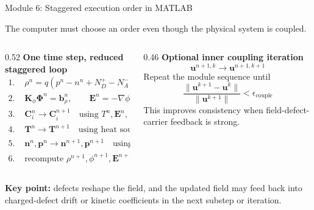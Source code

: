 \documentclass[aspectratio=169,9pt]{beamer}
\newcommand{\grad}{\nabla}
\newcommand{\E}{\bm{E}}
\newcommand{\vect}[1]{\bm{#1}}
\newcommand{\mat}[1]{\mathbf{#1}}
\begin{document}
\begin{frame}{Module 6: Staggered execution order in MATLAB}
\footnotesize
\vspace{-3mm}
\begin{bluebox}
\centering
The computer must choose an order even though the physical system is coupled.
\end{bluebox}

\vspace{1mm}
\begin{columns}[T,totalwidth=\textwidth]
\begin{column}{0.52\textwidth}
\textbf{One time step, reduced staggered loop}
\begin{align*}
\text{1. }&\rho^n=q(p^n-n^n+N_D^+-N_A^-)+q\sum_i z_iC_i^n,\\
\text{2. }&\mat{K}_{\phi}\vect{\Phi}^n=\vect{b}_{\rho}^n,
\qquad \E^n=-\grad\phi^n,\\
\text{3. }&\vect{C}_i^{n}\rightarrow\vect{C}_i^{n+1}\quad\text{using }T^n,\E^n,\\
\text{4. }&\vect{T}^{n}\rightarrow\vect{T}^{n+1}\quad\text{using heat sources},\\
\text{5. }&\vect{n}^{n},\vect{p}^{n}\rightarrow\vect{n}^{n+1},\vect{p}^{n+1}\quad\text{using }\E^n,C_i^{n+1},T^{n+1},\\
\text{6. }&\text{recompute }\rho^{n+1},\phi^{n+1},\E^{n+1}.
\end{align*}
\end{column}
\begin{column}{0.46\textwidth}
\textbf{Optional inner coupling iteration}
\begin{equation*}
\boxed{\vect{u}^{n+1,k}\rightarrow\vect{u}^{n+1,k+1}}
\end{equation*}
\small
Repeat the module sequence until
\begin{equation*}
\boxed{\frac{\|\vect{u}^{k+1}-\vect{u}^{k}\|}{\|\vect{u}^{k+1}\|}<\epsilon_{\mathrm{couple}}}
\end{equation*}
\small
This improves consistency when field-defect-carrier feedback is strong.
\end{column}
\end{columns}

\vspace{1mm}
\begin{orangebox}
\centering\scriptsize
\textbf{Key point:} defects reshape the field, and the updated field may feed back into charged-defect drift or kinetic coefficients in the next substep or iteration.
\end{orangebox}
\end{frame}
\end{document}
